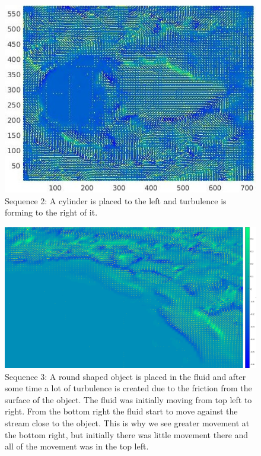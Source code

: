 \documentclass[english,a4paper,12pt]{article}
\begin{document}
\begin{figure}[H]
    \centering
    \includegraphics[width=140mm]{sek2.jpg}
    \caption{Sequence 2: A cylinder is placed to the left and turbulence is forming to the right of it.}
    \label{fig:4}
\end{figure}

\begin{figure}[H]
    \centering
    \includegraphics[width=140mm]{sek3.png}
    \caption{Sequence 3: A round shaped object is placed in the fluid and after some time a lot of turbulence is created due to the friction from the surface of the object. The fluid was initially moving from top left to right. From the bottom right the fluid start to move against the stream close to the object. This is why we see greater movement at the bottom right, but initially there was little movement there and all of the movement was in the top left.}
    \label{fig:5}
\end{figure}
\end{document}
